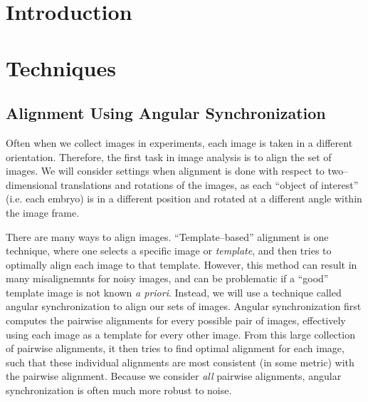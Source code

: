 \documentclass[12pt]{article}
\begin{document}
\section{Introduction}


\section{Techniques}


\subsection{Alignment Using Angular Synchronization}

Often when we collect images in experiments, each image is taken in a different orientation. 
%
Therefore, the first task in image analysis is to align the set of images. 
%
We will consider settings when alignment is done with respect to two--dimensional translations and rotations of the images, as each ``object of interest'' (i.e. each embryo) is in a different position and rotated at a different angle within the image frame. 

There are many ways to align images. 
%
``Template--based'' alignment \cite{ahuja2007template} is one technique, where one selects a specific image or {\em template}, and then tries to optimally align each image to that template.
%
However, this method can result in many misalignemnts for noisy images, and can be problematic if a ``good'' template image is not known {\em a priori}. 
%
Instead, we will use a technique called angular synchronization\cite{singer2011angular} to align our sets of images.
%
Angular synchronization first computes the pairwise alignments for every possible pair of images, effectively using each image as a template for every other image.
%
From this large collection of pairwise alignments, it then tries to find optimal alignment for each image, such that these individual alignments are most consistent (in some metric) with the pairwise alignment.
%
Because we consider {\em all} pairwise alignments, angular synchronization is often much more robust to noise. 
\end{document}
